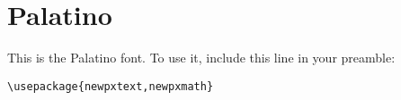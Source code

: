\documentclass{article}
\begin{document}
\section*{Palatino}
This is the Palatino font.
To use it, include this line in your preamble:
\begin{verbatim}
\usepackage{newpxtext,newpxmath}
\end{verbatim}


\end{document}
